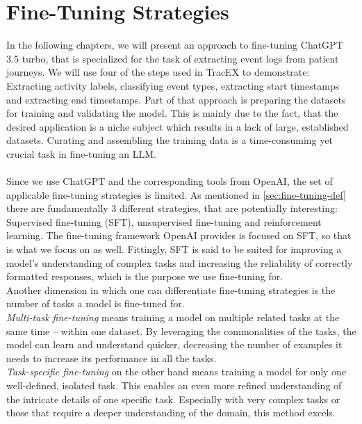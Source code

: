\section{Fine-Tuning Strategies}\label{sec:fine}
In the following chapters, we will present an approach to fine-tuning ChatGPT 3.5 turbo, that is specialized for the task of extracting event logs from patient journeys. We will use four of the steps used in TracEX to demonstrate: Extracting activity labels, classifying event types, extracting start timestamps and extracting end timestamps. Part of that approach is preparing the datasets for training and validating the model. This is mainly due to the fact, that the desired application is a niche subject which results in a lack of large, established datasets. Curating and assembling the training data is a time-consuming yet crucial task in fine-tuning an LLM.\\\\
Since we use ChatGPT and the corresponding tools from OpenAI, the set of applicable fine-tuning strategies is limited. As mentioned in \ref{sec:fine-tuning-def} there are fundamentally 3 different strategies, that are potentially interesting: Supervised fine-tuning (SFT), unsupervised fine-tuning and reinforcement learning. The fine-tuning framework OpenAI provides is focused on SFT, so that is what we focus on as well. Fittingly, SFT is said to be suited for improving a model's understanding of complex tasks and increasing the reliability of correctly formatted responses, which is the purpose we use fine-tuning for.\\
Another dimension in which one can differentiate fine-tuning strategies is the number of tasks a model is fine-tuned for.\\
\emph{Multi-task fine-tuning} means training a model on multiple related tasks at the same time – within one dataset. By leveraging the commonalities of the tasks, the model can learn and understand quicker, decreasing the number of examples it needs to increase its performance in all the tasks.\\
\emph{Task-specific fine-tuning} on the other hand means training a model for only one well-defined, isolated task. This enables an even more refined understanding of the intricate details of one specific task. Especially with very complex tasks or those that require a deeper understanding of the domain, this method excels.\\\\
